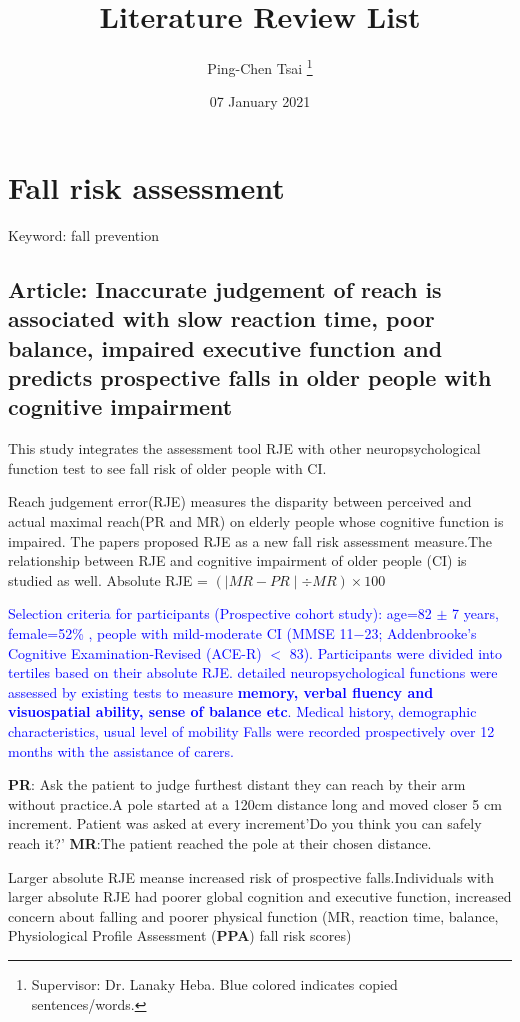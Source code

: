 \documentclass{article}
\title{Literature Review List}
\author{Ping-Chen Tsai  \thanks{Supervisor: Dr. Lanaky Heba. Blue colored indicates copied sentences/words.}}
\date{07 January 2021}
\begin{document}
\maketitle

\tableofcontents
\pagebreak


\section{Fall risk assessment}
Keyword: fall prevention

\subsection{Article: Inaccurate judgement of reach is associated with slow reaction time, poor balance, impaired executive function and predicts prospective falls in older people with cognitive impairment}

This study integrates the assessment tool RJE with other neuropsychological function test to see fall risk of older people with CI.

Reach judgement error(RJE) measures the disparity between perceived and actual maximal reach(PR and MR) on elderly people whose cognitive function is impaired. The papers proposed RJE as a new fall risk assessment measure.The relationship between RJE and cognitive impairment of older people (CI) is studied as well. 
Absolute RJE = $(\mid  MR-PR\mid \div MR)\times 100$

\textcolor{blue}{Selection criteria for participants (Prospective cohort study): age=82 $\pm$ 7 years, female=52\% , people with mild-moderate CI
(MMSE 11$-$23; Addenbrooke's Cognitive Examination-Revised (ACE-R) $<$ 83). Participants were divided into tertiles based on their absolute RJE. detailed neuropsychological functions were assessed by existing tests to measure \textbf{memory, verbal fluency and visuospatial ability, sense of balance etc}. Medical history, demographic characteristics, usual level of mobility Falls were recorded prospectively over 12 months with the assistance of carers.}

\textbf{PR}: Ask the patient to judge furthest distant they can reach by their arm without practice.A pole started at a 120cm distance long and moved closer 5 cm increment. Patient was asked at every increment'Do you think you can safely reach it?' \textbf{MR}:The patient reached the pole at their chosen distance.

Larger absolute RJE meanse increased risk of prospective falls.Individuals with larger absolute RJE had poorer global cognition and executive function, increased concern about falling and poorer physical function (MR, reaction time, balance, Physiological Profile Assessment (\textbf{PPA}) fall risk scores)
\end{document}
